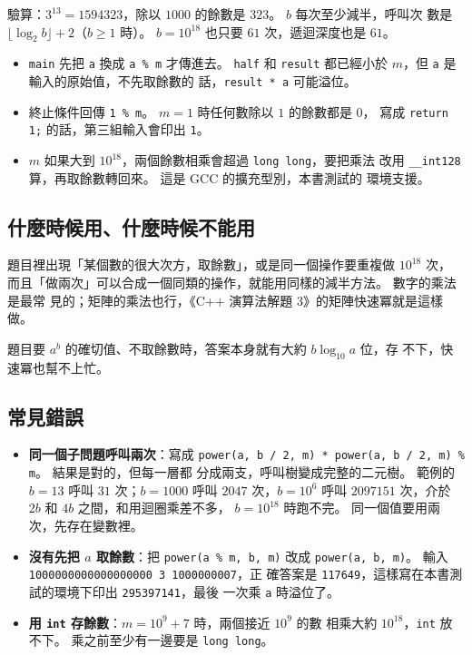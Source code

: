 驗算：$3^{13} = 1594323$，除以 $1000$ 的餘數是 $323$。 $b$ 每次至少減半，呼叫次
數是 $\lfloor \log_2 b \rfloor + 2$（$b \ge 1$ 時）。 $b = 10^{18}$ 也只要 $61$
次，遞迴深度也是 $61$。

\begin{itemize}
\item \texttt{main} 先把 \texttt{a} 換成 \texttt{a \% m} 才傳進去。 \texttt{half}
和 \texttt{result} 都已經小於 $m$，但 \texttt{a} 是輸入的原始值，不先取餘數的
話，\texttt{result * a} 可能溢位。
\item 終止條件回傳 \texttt{1 \% m}。 $m = 1$ 時任何數除以 $1$ 的餘數都是 $0$，
寫成 \texttt{return 1;} 的話，第三組輸入會印出 \texttt{1}。
\item $m$ 如果大到 $10^{18}$，兩個餘數相乘會超過 \texttt{long long}，要把乘法
改用 \texttt{\_\_int128} 算，再取餘數轉回來。 這是 GCC 的擴充型別，本書測試的
環境支援。
\end{itemize}

\subsection{什麼時候用、什麼時候不能用}

題目裡出現「某個數的很大次方，取餘數」，或是同一個操作要重複做 $10^{18}$ 次，
而且「做兩次」可以合成一個同類的操作，就能用同樣的減半方法。 數字的乘法是最常
見的；矩陣的乘法也行，《C++ 演算法解題 3》的矩陣快速冪就是這樣做。

題目要 $a^b$ 的確切值、不取餘數時，答案本身就有大約 $b \log_{10} a$ 位，存
不下，快速冪也幫不上忙。

\subsection{常見錯誤}

\begin{itemize}
\item \textbf{同一個子問題呼叫兩次}：寫成
\texttt{power(a, b / 2, m) * power(a, b / 2, m) \% m}。 結果是對的，但每一層都
分成兩支，呼叫樹變成完整的二元樹。 範例的 $b = 13$ 呼叫 $31$ 次；$b = 1000$
呼叫 $2047$ 次，$b = 10^6$ 呼叫 $2097151$ 次，介於 $2b$ 和 $4b$ 之間，和用迴圈乘差不多，
$b = 10^{18}$ 時跑不完。 同一個值要用兩次，先存在變數裡。
\item \textbf{沒有先把 $a$ 取餘數}：把 \texttt{power(a \% m, b, m)} 改成
\texttt{power(a, b, m)}。 輸入 \texttt{1000000000000000000 3 1000000007}，正
確答案是 \texttt{117649}，這樣寫在本書測試的環境下印出 \texttt{295397141}，最後
一次乘 \texttt{a} 時溢位了。
\item \textbf{用 \texttt{int} 存餘數}：$m = 10^9 + 7$ 時，兩個接近 $10^9$ 的數
相乘大約 $10^{18}$，\texttt{int} 放不下。 乘之前至少有一邊要是
\texttt{long long}。
\end{itemize}

